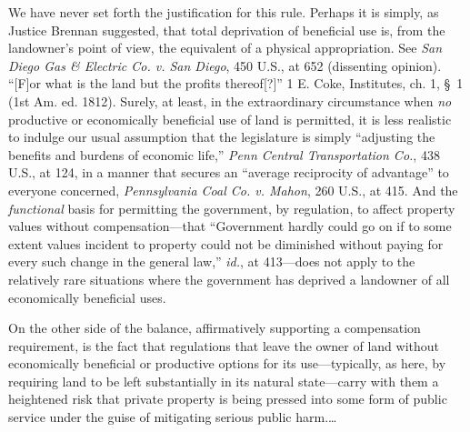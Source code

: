 We have never set forth the justification for this rule. Perhaps it is simply,
as Justice Brennan suggested, that total deprivation of beneficial use is, from
the landowner's point of view, the equivalent of a physical appropriation. See
\textit{San Diego Gas \& Electric Co. v. San Diego}, 450 U.S., at 652
(dissenting opinion). ``[F]or what is the land but the profits thereof[?]'' 1 E.
Coke, Institutes, ch. 1, \S~1 (1st Am. ed. 1812). Surely, at least, in the
extraordinary circumstance when \textit{no} productive or economically
beneficial use of land is permitted, it is less realistic to indulge our usual
assumption that the legislature is simply ``adjusting the benefits and burdens
of economic life,'' \textit{Penn Central Transportation Co.}, 438 U.S., at 124,
in a manner that secures an ``average reciprocity of advantage'' to everyone
concerned, \textit{Pennsylvania Coal Co. v. Mahon}, 260 U.S., at 415. And the
\textit{functional} basis for permitting the government, by regulation, to
affect property values without compensation---that ``Government hardly could go
on if to some extent values incident to property could not be diminished without
paying for every such change in the general law,'' \textit{id.}, at 413---does
not apply to the relatively rare situations where the government has deprived a
landowner of all economically beneficial uses.

On the other side of the balance, affirmatively supporting a compensation
requirement, is the fact that regulations that leave the owner of land without
economically beneficial or productive options for its use---typically, as here,
by requiring land to be left substantially in its natural state---carry with
them a heightened risk that private property is being pressed into some form of
public service under the guise of mitigating serious public harm.\ldots

